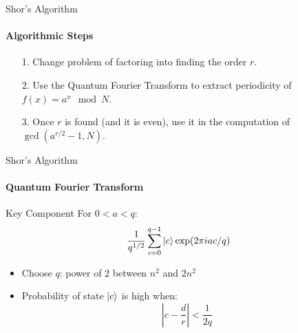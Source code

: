 \documentclass{beamer}
\begin{document}


\begin{frame}{Shor's Algorithm}
	\framesubtitle{Algorithmic Steps}
	\begin{itemize}
		\item[1.] Change problem of factoring into finding the order \(r\).
		\pause
		\item[2.] Use the Quantum Fourier Transform to extract periodicity of \(f(x) = a^x \mod N\).
		\pause
		\item[3.] Once \(r\) is found (and it is even), use it in the computation of \(\gcd(a^{r/2} - 1, N)\).   
	\end{itemize}
	
\end{frame}




\begin{frame}{Shor's Algorithm}
	\framesubtitle{Quantum Fourier Transform}
    \begin{block}{Key Component}
        For \(0 < a < q\):
        \[ \frac{1}{q^{1/2}} \sum_{c = 0}^{q - 1} \ket{c} \exp(2\pi i a c /q) \]
    \end{block}
    \begin{itemize}
        \item Choose \(q\): power of 2 between \(n^2\) and \(2n^2\)
        \item Probability of state \(\ket{c}\) is high when:
        \[ \left| c - \frac{d}{r} \right| < \frac{1}{2q} \]
    \end{itemize}
\end{frame}



\end{document}
